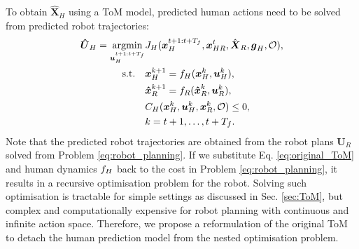 To obtain $\hat{\boldsymbol{X}}_{H}$ using a ToM model, predicted human actions need to be solved from predicted robot trajectories:
\begin{equation}
\label{eq:original_ToM}
\begin{aligned}
    \boldsymbol{\hat{U}}_{H} = \operatorname*{argmin}_{\boldsymbol{u}_H^{t+1:t+T_{f}}} &J_{H}(\boldsymbol{x}_{H}^{t+1:t+T_{f}}, \boldsymbol{x}_{HR}^{t}, \hat{\boldsymbol{X}}_{R}, \boldsymbol{g}_{H}, \mathcal{O}), \\
    \text{s.t.} \quad &\boldsymbol{x}_{H}^{k+1} = f_{H}(\boldsymbol{x}_{H}^{k}, \boldsymbol{u}_{H}^{k}), \\
                      &\boldsymbol{\hat{x}}_{R}^{k+1} = f_{R}(\boldsymbol{\hat{x}}_{R}^{k}, \boldsymbol{u}_{R}^{k}), \\
                      &C_{H}(\boldsymbol{x}_{H}^{k}, \boldsymbol{u}_{H}^{k}, \boldsymbol{x}_{R}^{k}, \mathcal{O}) \leq 0, \\
                      &k = t+1, \dots, t+T_{f}. \\
\end{aligned}
\end{equation}
Note that the predicted robot trajectories are obtained from the robot plans $\boldsymbol{U}_{R}$ solved from Problem \eqref{eq:robot_planning}. 
If we substitute Eq. \eqref{eq:original_ToM} and human dynamics $f_{H}$ back to the cost in Problem \eqref{eq:robot_planning}, it results in a recursive optimisation problem for the robot. 
Solving such optimisation is tractable for simple settings as discussed in Sec. \ref{sec:ToM}, but complex and computationally expensive for robot planning with continuous and infinite action space. 
Therefore, we propose a reformulation of the original ToM to detach the human prediction model from the nested optimisation problem.

